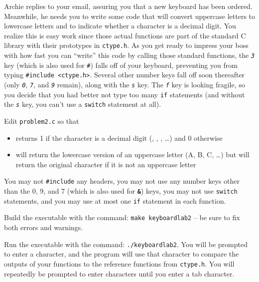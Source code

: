 Archie replies to your email, assuring you that a new keyboard has been ordered.
Meanwhile, he needs you to write some code that will convert uppercase letters to lowercase letters and to indicate whether a character is a decimal digit.
You realize this is easy work since those actual functions are part of the standard C library with their prototypes in \texttt{ctype.h}.
As you get ready to impress your boss with how fast you can ``write'' this code by calling those standard functions, the \textit{\texttt{3}} key (which is also used for \textit{\texttt{\#}}) falls off of your keyboard, preventing you from typing \lstinline{#include <ctype.h>}.
Several other number keys fall off soon thereafter (only \textit{\texttt{0}}, \textit{\texttt{7}}, and \textit{\texttt{9}} remain), along with the \textit{\texttt{s}} key.
The \textit{\texttt{f}} key is looking fragile, so you decide that you had better not type too many \lstinline{if} statements (and without the \textit{\texttt{s}} key, you can't use a \lstinline{switch} statement at all).

Edit \texttt{problem2.c} so that
\begin{itemize}
    \item {} returns 1 if the character is a decimal digit (\textquotesingle, \textquotesingle, \textquotesingle, \dots) and 0 otherwise
    \item {} will return the lowercase version of an uppercase letter (\textquotesingle A\textquotesingle, \textquotesingle B\textquotesingle, \textquotesingle C\textquotesingle, \dots) but will return the original character if it is not an uppercase letter
\end{itemize}
You may not \lstinline{#include} any headers, you may not use any number keys other than the 0, 9, and 7 (which is also used for \textbf{\texttt{\&}}) keys, you may not use \lstinline{switch} statements, and you may use at most one \lstinline{if} statement in each function.

Build the executable with the command: \texttt{make keyboardlab2} -- be sure to fix both errors and warnings.

Run the executable with the command: \texttt{./keyboardlab2}.
You will be prompted to enter a character, and the program will use that character to compare the outputs of your functions to the reference functions from \texttt{ctype.h}.
You will repeatedly be prompted to enter characters until you enter a tab character.

